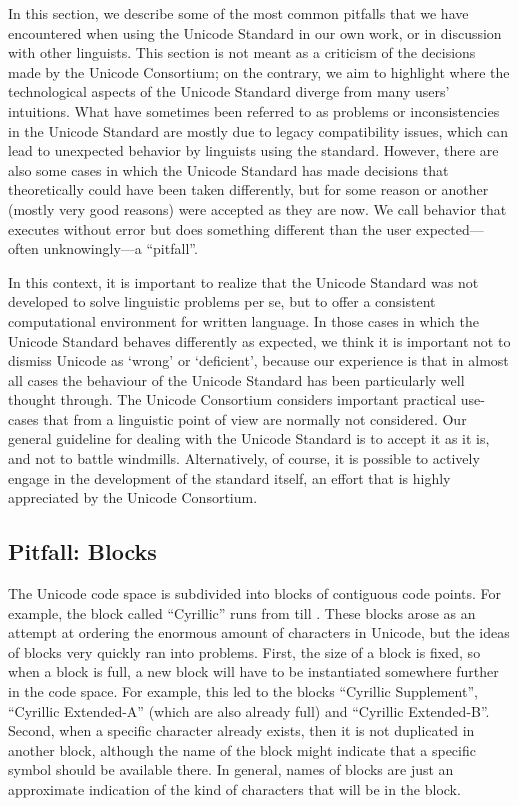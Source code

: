 {{{{{{{{{{{{{{{{In this section, we describe some of the most common pitfalls that we have encountered when using the Unicode Standard in our own work, or in discussion with other linguists. This section is not meant as a criticism of the decisions made by the Unicode Consortium; on the contrary, we aim to highlight where the technological aspects of the Unicode Standard diverge from many users' intuitions. What have sometimes been referred to as problems or inconsistencies in the Unicode Standard are mostly due to legacy compatibility issues, which can lead to unexpected behavior by linguists using the standard. However, there are also some cases in which the Unicode Standard has made decisions that theoretically could have been taken differently, but for some reason or another (mostly very good reasons) were accepted as they are now. We call behavior that executes without error but does something different than the user expected---often unknowingly---a ``pitfall''.

In this context, it is important to realize that the Unicode Standard was not developed to solve linguistic problems per se, but to offer a consistent computational environment for written language. In those cases in which the Unicode Standard behaves differently as expected, we think it is important not to dismiss Unicode as `wrong' or `deficient', because our experience is that in almost all cases the behaviour of the Unicode Standard has been particularly well thought through. The Unicode Consortium considers important practical use-cases that from a linguistic point of view are normally not considered. Our general guideline for dealing with the Unicode Standard is to accept it as it is, and not to battle windmills. Alternatively, of course, it is possible to actively engage in the development of the standard itself, an effort that is highly appreciated by the Unicode Consortium.

\subsection{Pitfall: Blocks}\label{pitfall-blocks}

The Unicode code space is subdivided into blocks of contiguous code points. For example, the block called ``Cyrillic'' runs from  till . These blocks arose as an attempt at ordering the enormous amount of characters in Unicode, but the ideas of blocks very quickly ran into problems. First, the size of a block is fixed, so when a block is full, a new block will have to be instantiated somewhere further in the code space. For example, this led to the blocks ``Cyrillic Supplement'', ``Cyrillic Extended-A'' (which are also already full) and ``Cyrillic Extended-B''. Second, when a specific character already exists, then it is not duplicated in another block, although the name of the block might indicate that a specific symbol should be available there. In general, names of blocks are just an approximate indication of the kind of characters that will be in the block.

}}}}}}}}}}}}}}}}
